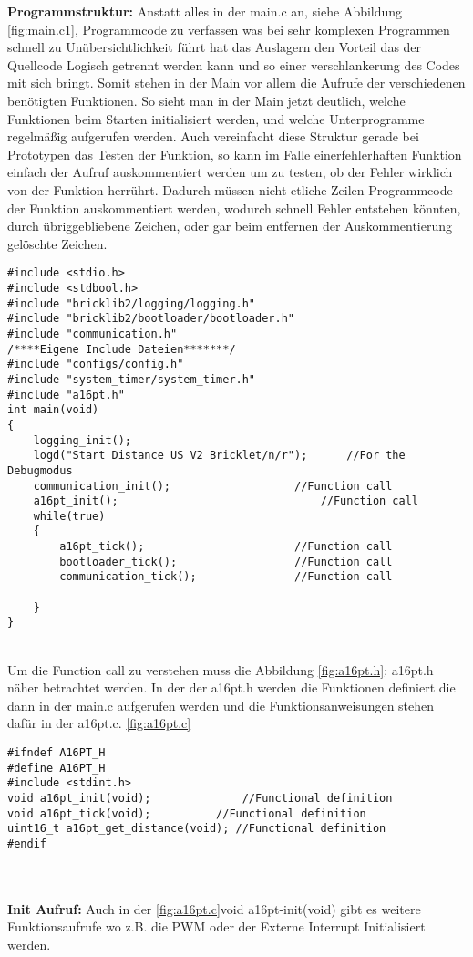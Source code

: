 \textbf{Programmstruktur:}
Anstatt alles in der main.c an, siehe Abbildung \ref{fig:main.c1}, Programmcode zu verfassen was bei sehr komplexen Programmen schnell zu Unübersichtlichkeit führt hat das Auslagern den Vorteil das der Quellcode Logisch getrennt werden kann und so einer verschlankerung des Codes mit sich bringt. 
Somit stehen in der Main  vor allem die Aufrufe der verschiedenen benötigten Funktionen. So sieht man in der Main jetzt deutlich, welche Funktionen beim Starten initialisiert werden, und welche Unterprogramme regelmäßig aufgerufen werden. Auch vereinfacht diese Struktur gerade bei Prototypen das Testen der Funktion, so kann im Falle einerfehlerhaften Funktion einfach der Aufruf auskommentiert werden um zu testen, ob der Fehler wirklich von der Funktion herrührt. Dadurch müssen nicht etliche Zeilen Programmcode der Funktion auskommentiert werden, wodurch schnell Fehler entstehen könnten, durch übriggebliebene Zeichen, oder gar beim entfernen der Auskommentierung gelöschte Zeichen.\\
\begin{minipage}{1\textwidth}
\begin{lstlisting}
#include <stdio.h>
#include <stdbool.h>
#include "bricklib2/logging/logging.h"
#include "bricklib2/bootloader/bootloader.h"
#include "communication.h"
/****Eigene Include Dateien*******/
#include "configs/config.h"
#include "system_timer/system_timer.h"
#include "a16pt.h"
int main(void)
{ 
	logging_init(); 
	logd("Start Distance US V2 Bricklet/n/r");  	//For the Debugmodus
	communication_init(); 					//Function call
	a16pt_init(); 								//Function call	
	while(true)
	{
		a16pt_tick(); 						//Function call
		bootloader_tick(); 					//Function call
		communication_tick(); 				//Function call
		
	}
}
\end{lstlisting}
\label{fig:main.c1}
\end{minipage}\\
Um die Function call zu verstehen muss die Abbildung \ref{fig:a16pt.h}: a16pt.h näher betrachtet werden.
In der der a16pt.h werden die Funktionen definiert die dann in der main.c aufgerufen werden und die Funktionsanweisungen stehen dafür in der a16pt.c. \ref{fig:a16pt.c}\\
\begin{minipage}{1\textwidth}
\begin{lstlisting}
#ifndef A16PT_H
#define A16PT_H
#include <stdint.h>
void a16pt_init(void);				//Functional definition
void a16pt_tick(void); 			//Functional definition
uint16_t a16pt_get_distance(void); //Functional definition
#endif
\end{lstlisting}
\label{fig:a16pt.h}
\end{minipage}\\
\\
\textbf{Init Aufruf:}
Auch in der \ref{fig:a16pt.c}void a16pt-init(void) gibt es weitere Funktionsaufrufe wo z.B. die PWM oder der Externe Interrupt Initialisiert werden.

